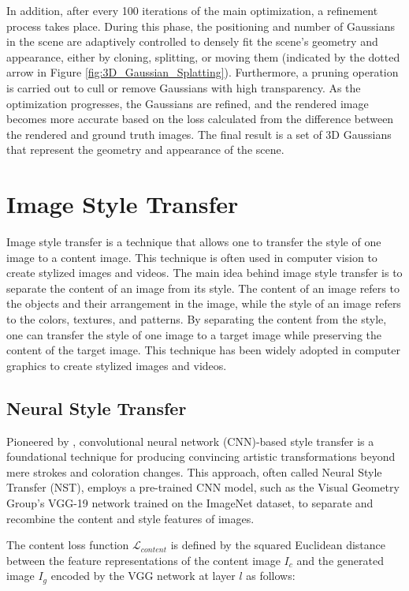 In addition, after every 100 iterations of the main optimization, a refinement process takes place. During this phase, the positioning and number of Gaussians in the scene are adaptively controlled to densely fit the scene's geometry and appearance, either by cloning, splitting, or moving them (indicated by the dotted arrow in Figure \ref{fig:3D_Gaussian_Splatting}). Furthermore, a pruning operation is carried out to cull or remove Gaussians with high transparency. As the optimization progresses, the Gaussians are refined, and the rendered image becomes more accurate based on the loss calculated from the difference between the rendered and ground truth images. The final result is a set of 3D Gaussians that represent the geometry and appearance of the scene.

\section{Image Style Transfer}

Image style transfer is a technique that allows one to transfer the style of one image to a content image. This technique is often used in computer vision to create stylized images and videos. The main idea behind image style transfer is to separate the content of an image from its style. The content of an image refers to the objects and their arrangement in the image, while the style of an image refers to the colors, textures, and patterns. By separating the content from the style, one can transfer the style of one image to a target image while preserving the content of the target image. This technique has been widely adopted in computer graphics to create stylized images and videos.

\subsection{Neural Style Transfer}

Pioneered by \textcite{Gatys.2015}, convolutional neural network (CNN)-based style transfer is a foundational technique for producing convincing artistic transformations beyond mere strokes and coloration changes. This approach, often called Neural Style Transfer (NST), employs a pre-trained CNN model, such as the Visual Geometry Group's VGG-19 network trained on the ImageNet dataset, to separate and recombine the content and style features of images. 

The content loss function $ \mathcal{L}_{content}$ is defined by the squared Euclidean distance between the feature representations of the content image $I_c$ and the generated image $I_g$ encoded by the VGG network at layer $l$ as follows:

